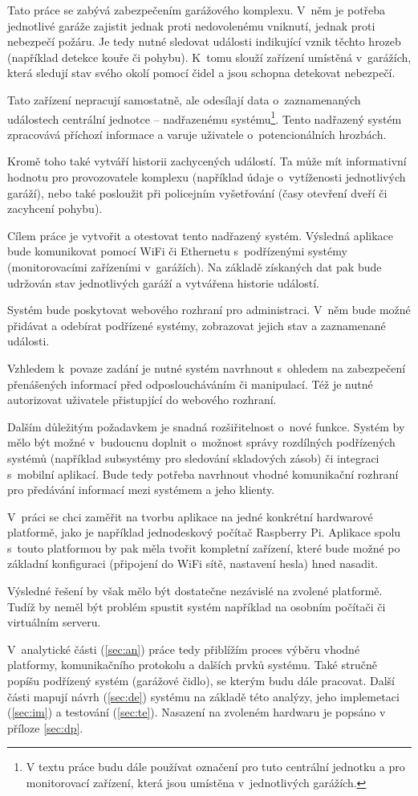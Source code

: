 Tato práce se zabývá zabezpečením garážového komplexu. V~něm je potřeba jednotlivé garáže zajistit jednak proti nedovolenému vniknutí, jednak proti nebezpečí požáru. Je tedy nutné sledovat události indikující vznik těchto hrozeb (například detekce kouře či pohybu). K~tomu slouží zařízení umístěná v~garážích, která sledují stav svého okolí pomocí čidel a jsou schopna detekovat nebezpečí. 

Tato zařízení nepracují samostatně, ale odesílají data o~zaznamenaných událostech centrální jednotce -- nadřazenému systému\footnote{V textu práce budu dále používat označení  pro tuto centrální jednotku a  pro monitorovací zařízení, která jsou umístěna v~jednotlivých garážích.}. Tento nadřazený systém zpracovává příchozí informace a varuje uživatele o~potencionálních hrozbách.

Kromě toho také vytváří historii zachycených událostí. Ta může mít informativní hodnotu pro provozovatele komplexu (například údaje o~vytíženosti jednotlivých garáží), nebo také posloužit při policejním vyšetřování (časy otevření dveří či zacyhcení pohybu).

Cílem práce je vytvořit a otestovat tento nadřazený systém. Výsledná aplikace bude komunikovat pomocí WiFi či Ethernetu s~podřízenými systémy (monitorovacími zařízeními v~garážích). Na základě získaných dat pak bude udržován stav jednotlivých garáží a vytvářena historie událostí.

Systém bude poskytovat webového rozhraní pro administraci. V~něm bude možné přidávat a odebírat podřízené systémy, zobrazovat jejich stav a zaznamenané události.

Vzhledem k~povaze zadání je nutné systém navrhnout s~ohledem na zabezpečení přenášených informací před odposloucháváním či manipulací. Též je nutné autorizovat uživatele přistupjící do webového rozhraní.

Dalším důležitým požadavkem je snadná rozšiřitelnost o~nové funkce. Systém by mělo být možné v~budoucnu doplnit o~možnost správy rozdílných podřízených systémů (například subsystémy pro sledování skladových zásob) či integraci s~mobilní aplikací. Bude tedy potřeba navrhnout vhodné komunikační rozhraní pro předávání informací mezi systémem a jeho klienty. 

V~práci se chci zaměřit na tvorbu aplikace na jedné konkrétní hardwarové platformě, jako je například jednodeskový počítač Raspberry Pi. Aplikace spolu s~touto platformou by pak měla tvořit kompletní zařízení, které bude možné po základní konfiguraci (připojení do WiFi sítě, nastavení hesla) hned nasadit.

Výsledné řešení by však mělo být dostatečne nezávislé na zvolené platformě. Tudíž by neměl být problém spustit systém například na osobním počítači či virtuálním serveru.

V~analytické části (\ref{sec:an}) práce tedy přiblížím proces výběru vhodné platformy, komunikačního protokolu a dalších prvků systému. Také stručně popíšu podřízený systém (garážové čidlo), se kterým budu dále pracovat. Další části mapují návrh (\ref{sec:de}) systému na základě této analýzy, jeho implemetaci (\ref{sec:im}) a testování (\ref{sec:te}). Nasazení na zvoleném hardwaru je popsáno v příloze \ref{sec:dp}.